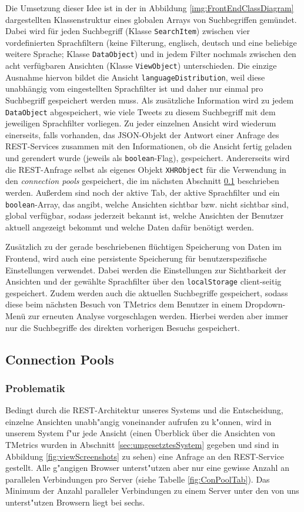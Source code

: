 Die Umsetzung dieser Idee ist in der in Abbildung
\ref{img:FrontEndClassDiagram}
dargestellten Klassenstruktur eines globalen Arrays von Suchbegriffen gemündet. Dabei wird für jeden Suchbegriff (Klasse \texttt{SearchItem}) zwischen vier vordefinierten Sprachfiltern (keine Filterung, englisch, deutsch und eine beliebige weitere Sprache; Klasse \texttt{DataObject}) und in jedem Filter nochmals zwischen den acht verfügbaren Ansichten (Klasse \texttt{ViewObject}) unterschieden. Die einzige Ausnahme hiervon bildet die Ansicht \texttt{languageDistribution}, weil diese unabhängig vom eingestellten Sprachfilter ist und daher nur einmal pro Suchbegriff gespeichert werden muss.
Als zusätzliche Information wird zu jedem \texttt{DataObject} abgespeichert, wie viele Tweets zu diesem Suchbegriff mit dem jeweiligen Sprachfilter vorliegen.
Zu jeder einzelnen Ansicht wird wiederum einerseits, falls vorhanden, das JSON-Objekt der Antwort einer Anfrage des REST-Services zusammen mit den Informationen, ob die Ansicht fertig geladen und gerendert wurde (jeweils als \texttt{boolean}-Flag), gespeichert. Andererseits wird die REST-Anfrage selbst als eigenes Objekt \texttt{XHRObject} für die Verwendung in den \textit{connection pools} gespeichert, die im nächsten Abschnitt \ref{sec:conPool} beschrieben werden.
Außerdem sind noch der aktive Tab, der aktive Sprachfilter und ein \texttt{boolean}-Array, das angibt, welche Ansichten sichtbar bzw. nicht sichtbar sind, global verfügbar, sodass jederzeit bekannt ist, welche Ansichten der Benutzer aktuell angezeigt bekommt und welche Daten dafür benötigt werden.

Zusätzlich zu der gerade beschriebenen flüchtigen Speicherung von Daten im Frontend, wird auch eine persistente Speicherung für benutzerspezifische Einstellungen verwendet. Dabei werden die Einstellungen zur Sichtbarkeit der Ansichten und der gewählte Sprachfilter über den \texttt{localStorage} \cite{WebStorage} client-seitig gespeichert. Zudem werden auch die aktuellen Suchbegriffe gespeichert, sodass diese beim nächsten Besuch von TMetrics dem Benutzer in einem Dropdown-Menü zur erneuten Analyse vorgeschlagen werden. Hierbei werden aber immer nur die Suchbegriffe des direkten vorherigen Besuchs gespeichert.

\subsection{Connection Pools}
\label{sec:conPool}
\subsubsection{Problematik}
Bedingt durch die REST-Architektur unseres Systems und die Entscheidung, einzelne Ansichten unabh"angig voneinander aufrufen zu k"onnen, wird in unserem System f"ur jede Ansicht (einen Überblick über die Ansichten von TMetrics wurden in Abschnitt \ref{sec:umgesetztesSystem} gegeben und sind in Abbildung \ref{fig:viewScreenshots} zu sehen) eine Anfrage an den REST-Service gestellt. 
Alle g"angigen Browser unterst"utzen aber nur eine gewisse Anzahl an parallelen Verbindungen pro Server (siehe Tabelle \ref{fig:ConPoolTab}). Das Minimum der Anzahl paralleler Verbindungen zu einem Server unter den von uns unterst"utzen Browsern liegt bei sechs. 


